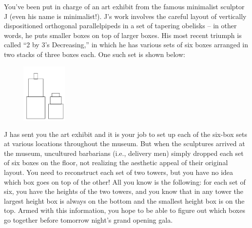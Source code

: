 You've been put in charge of an art exhibit from the famous minimalist sculptor J (even his name is minimalist!). 
J's work involves the careful layout of vertically dispositioned orthogonal parallelpipeds in a set of tapering 
obelisks -- in other words, he puts smaller boxes on top of larger boxes. 
His most recent triumph is called ``2 by 3's Decreasing,'' in which he has various sets of six boxes arranged in 
two stacks of three boxes each. One such set is shown below:

\begin{figure}[h]
\center
\includegraphics[width=0.20\textwidth ]{image/A.png}
\end{figure}

J has sent you the art exhibit and it is your job to set up each of the six-box sets at various locations 
throughout the museum. But when the sculptures arrived at the museum, uncultured barbarians (i.e., delivery men) 
simply dropped each set of six boxes on the floor, not realizing the aesthetic appeal of their original layout. 
You need to reconstruct each set of two towers, but you have no idea which box goes on top of the other! 
All you know is the following: for each set of six, you have the heights of the two towers, 
and you know that in any tower the largest height box is always on the bottom and the smallest 
height box is on the top. Armed with this information, you hope to be able to figure out which 
boxes go together before tomorrow night's grand opening gala.
